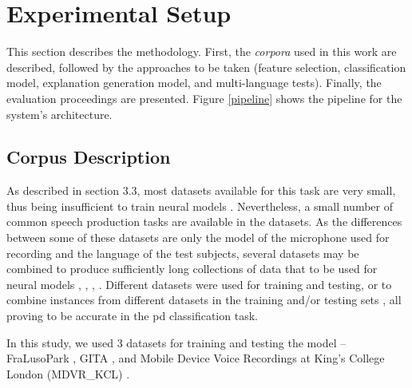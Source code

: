 
\chapter{Experimental Setup}
\label{ch:adipisci}



This section describes the methodology. First, the \textit{corpora} used in this work are described, followed by the approaches to be taken (feature selection, classification model, explanation generation model, and multi-language tests). Finally, the evaluation proceedings are presented. Figure \ref{pipeline} shows the pipeline for the system's architecture. 

\section{Corpus Description}

As described in section 3.3, most datasets available for this task are very small, thus being insufficient to train neural models \cite{underfitting_small_datasets}. Nevertheless, a small number of common speech production tasks are available in the datasets. As the differences between some of these datasets are only the model of the microphone used for recording and the language of the test subjects, several datasets may be combined to produce sufficiently long collections of data that to be used for neural models \cite{parkinson_braga}, \cite{parkinson_acoustic_despotovic}, \cite{parkinson_phonemic_relevance}, \cite{x_vector_parkinson}. Different datasets were used for training and testing, or to combine instances from different datasets in the training and/or testing sets \cite{parkinson_three_languages}, all proving to be accurate in the \gls{pd} classification task.

In this study, we used 3 datasets for training and testing the model -- FraLusoPark \cite{fralusopark}, GITA \cite{GITA}, and Mobile Device Voice Recordings at King's College London (MDVR\_KCL) \cite{MDVR}.

